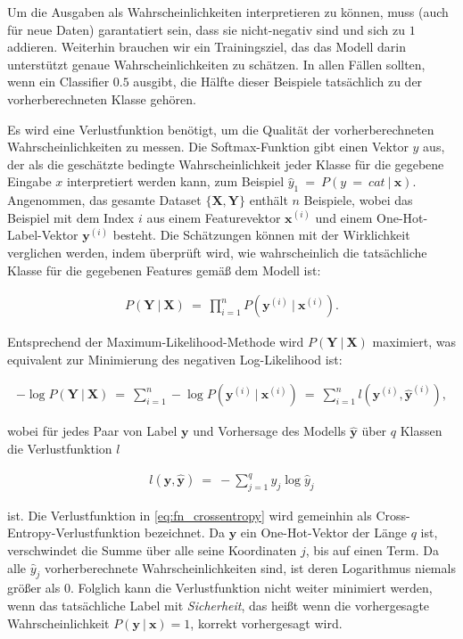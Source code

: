 Um die Ausgaben als Wahrscheinlichkeiten interpretieren zu können, muss (auch für neue Daten) garantatiert sein, dass sie nicht-negativ sind und sich zu $1$ addieren. Weiterhin brauchen wir ein Trainingsziel, das das Modell darin unterstützt genaue Wahrscheinlichkeiten zu schätzen. In allen Fällen sollten, wenn ein Classifier $0.5$ ausgibt, die Hälfte dieser Beispiele tatsächlich zu der vorherberechneten Klasse gehören.
\cite{zhang2020dive}

Es wird eine Verlustfunktion benötigt, um die Qualität der vorherberechneten Wahrscheinlichkeiten zu messen. Die Softmax-Funktion gibt einen Vektor $\hat{y}$ aus, der als die geschätzte bedingte Wahrscheinlichkeit jeder Klasse für die gegebene Eingabe $x$ interpretiert werden kann, zum Beispiel $\hat{y}_{1}\ =\ P(y\ =\ cat\ |\ \boldsymbol{x})$. Angenommen, das gesamte Dataset $\{\boldsymbol{X}, \boldsymbol{Y}\}$ enthält $n$ Beispiele, wobei das Beispiel mit dem Index $i$ aus einem Featurevektor $\boldsymbol{x}^{(i)}$ und einem One-Hot-Label-Vektor $\boldsymbol{y}^{(i)}$ besteht. Die Schätzungen können mit der Wirklichkeit verglichen werden, indem überprüft wird, wie wahrscheinlich die tatsächliche Klasse für die gegebenen Features gemäß dem Modell ist:

\begin{align}
  P(\boldsymbol{Y}\ |\ \boldsymbol{X})\ =\ \prod_{i=1}^{n}P(\boldsymbol{y}^{(i)}\ |\ \boldsymbol{x}^{(i)}).
\end{align}

Entsprechend der Maximum-Likelihood-Methode wird $P(\boldsymbol{Y}\ |\ \boldsymbol{X})$ maximiert, was equivalent zur Minimierung des negativen Log-Likelihood ist:

\begin{align}
  -\log P(\boldsymbol{Y}\ |\ \boldsymbol{X})\ =\ \sum_{i=1}^{n}-\log P(\boldsymbol{y}^{(i)}\ |\ \boldsymbol{x}^{(i)})\ =\ \sum_{i=1}^{n}l(\boldsymbol{y}^{(i)},\boldsymbol{\hat{y}}^{(i)}),
\end{align}

wobei für jedes Paar von Label $\boldsymbol{y}$ und Vorhersage des Modells $\boldsymbol{\hat{y}}$ über $q$ Klassen die Verlustfunktion $l$

\begin{align}
  \label{eq:fn_crossentropy}
  l(\boldsymbol{y}, \boldsymbol{\hat{y}})\ =\ - \sum_{j=1}^{q}y_{j}\log\hat{y}_{j}
\end{align}

ist. Die Verlustfunktion in \eqref{eq:fn_crossentropy} wird gemeinhin als Cross-Entropy-Verlustfunktion bezeichnet. Da $\boldsymbol{y}$ ein One-Hot-Vektor der Länge $q$ ist, verschwindet die Summe über alle seine Koordinaten $j$, bis auf einen Term. Da alle $\hat{y}_j$ vorherberechnete Wahrscheinlichkeiten sind, ist deren Logarithmus niemals größer als $0$. Folglich kann die Verlustfunktion nicht weiter minimiert werden, wenn das tatsächliche Label mit \textit{Sicherheit}, das heißt wenn die vorhergesagte Wahrscheinlichkeit $P(\boldsymbol{y}\ |\ \boldsymbol{x}) = 1$, korrekt vorhergesagt wird.

